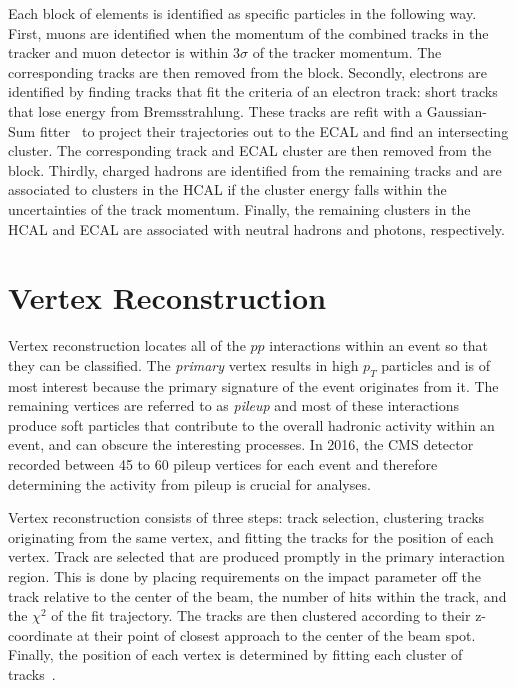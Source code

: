 Each block of elements is identified as specific particles in the following way. First, muons are identified when the momentum of the combined tracks in the tracker and muon detector is within $3 \sigma$ of the tracker momentum. The corresponding tracks are then removed from the block. Secondly, electrons are identified by finding tracks that fit the criteria of an electron track: short tracks that lose energy from Bremsstrahlung. These tracks are refit with a Gaussian-Sum fitter~\cite{GausSumFilter} to project their trajectories out to the ECAL and find an intersecting cluster. The corresponding track and ECAL cluster are then removed from the block. Thirdly, charged hadrons are identified from the remaining tracks and are associated to clusters in the HCAL if the cluster energy falls within the uncertainties of the track momentum. Finally, the remaining clusters in the HCAL and ECAL are associated with neutral hadrons and photons, respectively. 

\section{Vertex Reconstruction}

Vertex reconstruction locates all of the $pp$ interactions within an event so that they can be classified. The \textit{primary} vertex results in high $p_{T}$ particles and is of most interest because the primary signature of the event originates from it. The remaining vertices are referred to as \textit{pileup} and most of these interactions produce soft particles that contribute to the overall hadronic activity within an event, and can obscure the interesting processes. In 2016, the CMS detector recorded between 45 to 60 pileup vertices for each event and therefore determining the activity from pileup is crucial for analyses.

Vertex reconstruction consists of three steps: track selection, clustering tracks originating from the same vertex, and fitting the tracks for the position of each vertex. Track are selected that are produced promptly in the primary interaction region. This is done by placing requirements on the impact parameter off the track relative to the center of the beam, the number of hits within the track, and the $\chi^{2}$ of the fit trajectory. The tracks are then clustered according to their z-coordinate at their point of closest approach to the center of the beam spot. Finally, the position of each vertex is determined by fitting each cluster of tracks~\cite{TrackReco}. 

